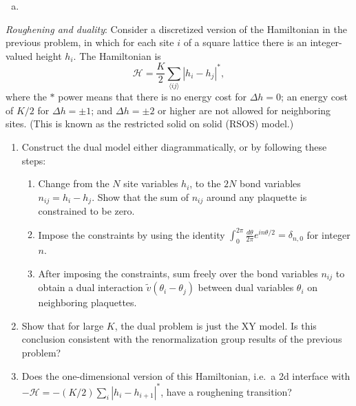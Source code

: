 \begin{solution}
    \begin{enumerate}[(a)]
        \item
    \end{enumerate}
\end{solution}

\begin{problem}
    \textit{Roughening and duality}: Consider a discretized version of the Hamiltonian in the previous problem, in which for each site $i$ of a square lattice there is an integer-valued height $h_i$. The Hamiltonian is
    \[
        \mathcal{H} = \frac{K}{2}\sum_{\langle ij\rangle}|h_i - h_j|^*,
    \]
    where the $*$ power means that there is no energy cost for $\Delta h = 0$; an energy cost of $K/2$ for $\Delta h = \pm 1$; and $\Delta h = \pm 2$ or higher are not allowed for neighboring sites. (This is known as the restricted solid on solid (RSOS) model.)

    \begin{enumerate}
        \item[(a)] Construct the dual model either diagrammatically, or by following these steps:
        \begin{enumerate}
            \item[(i)] Change from the $N$ site variables $h_i$, to the $2N$ bond variables $n_{ij} = h_i - h_j$. Show that the sum of $n_{ij}$ around any plaquette is constrained to be zero.
            \item[(ii)] Impose the constraints by using the identity $\int_0^{2\pi}\frac{d\theta}{2\pi}e^{in\theta/2} = \delta_{n,0}$ for integer $n$.
            \item[(iii)] After imposing the constraints, sum freely over the bond variables $n_{ij}$ to obtain a dual interaction $\tilde{v}(\theta_i - \theta_j)$ between dual variables $\theta_i$ on neighboring plaquettes.
        \end{enumerate}

        \item[(b)] Show that for large $K$, the dual problem is just the XY model. Is this conclusion consistent with the renormalization group results of the previous problem?

        \item[(c)] Does the one-dimensional version of this Hamiltonian, i.e.\ a 2d interface with $-\mathcal{H} = -(K/2)\sum_i|h_i - h_{i+1}|^*$, have a roughening transition?
    \end{enumerate}
\end{problem}

